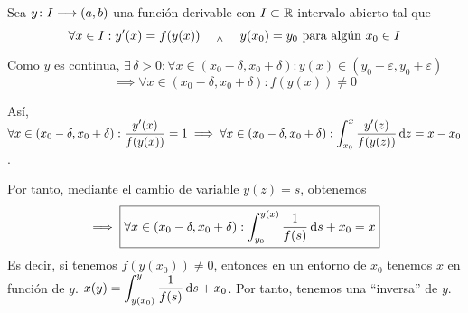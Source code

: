 Sea $y \colon I \longrightarrow (a,b)$ una función derivable con $I\subset \mathbb{R}$ intervalo abierto tal que
\[\forall x \in I : y'(x)=f(y(x)) \quad \; _{\wedge} \; \quad y(x_0)=y_0 \text{ para algún }x_0 \in I\]

Como $y$ es continua, $\exists \, \delta > 0 : \forall x \in (x_0-\delta, x_0+\delta) :y(x)\in(y_0-\varepsilon, y_0+\varepsilon)$
\[\implies \forall x \in (x_0-\delta, x_0+\delta) : f(y(x))\ne 0\]

Así, $\ds \forall x \in (x_0-\delta, x_0+\delta) : \frac{y'(x)}{f(y(x))}=1 \implies \forall x \in (x_0-\delta, x_0+\delta) : \int_{x_0}^{x} \frac{y'(z)}{f(y(z))}\odif{z} = x-x_0$.

Por tanto, mediante el cambio de variable $y(z) = s$, obtenemos
\[\implies \boxed{\forall x \in (x_0-\delta, x_0+\delta) : \int_{y_0}^{y(x)} \frac{1}{f(s)} \odif{s} + x_0 = x}\]
Es decir, si tenemos $f(y(x_0)) \ne 0$, entonces en un entorno de $x_0$ tenemos $x$ en función de $y$. $\ds x(y) = \int_{y(x_0)}^{y} \frac{1}{f(s)} \odif{s} + x_0$. Por tanto, tenemos una ``inversa'' de $y$.



